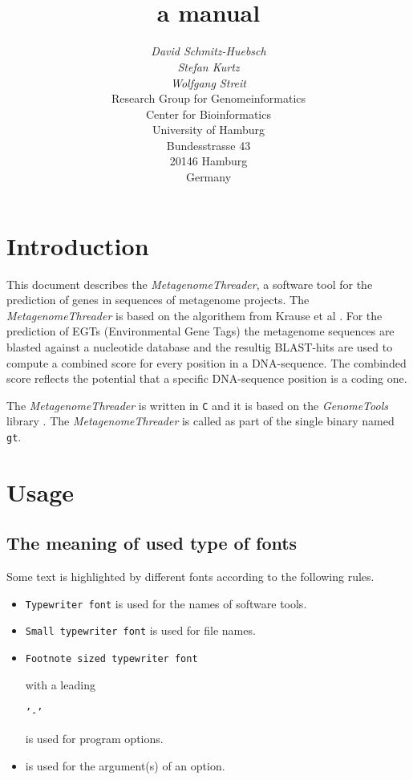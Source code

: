 \documentclass[12pt,titlepage]{article}
\title{\MetagenomeThreader\\
a manual}
\author{\begin{tabular}{c}
         \textit{David Schmitz-Huebsch}\\
         \textit{Stefan Kurtz}\\
         \textit{Wolfgang Streit}\\[1cm]
         Research Group for Genomeinformatics\\
         Center for Bioinformatics\\
         University of Hamburg\\
         Bundesstrasse 43\\
         20146 Hamburg\\
         Germany\\[1cm]
        \end{tabular}}
\newcommand{\MetagenomeThreader}{\textit{MetagenomeThreader}\xspace}
\newcommand{\GenomeTools}{\textit{GenomeTools}\xspace}
\newcommand{\Gt}{\texttt{gt}\xspace}
\begin{document}
\maketitle

\section{Introduction} \label{Introduction}

This document describes the \MetagenomeThreader, a software tool
for the prediction of genes in sequences of metagenome projects.
The \MetagenomeThreader is based on the algorithem from Krause et al \cite{krause}.
For the prediction of EGTs (Environmental Gene Tags) the metagenome sequences are
blasted against a nucleotide database and the resultig BLAST-hits are used to
compute a combined score for every position in a DNA-sequence. The combinded score
reflects the potential that a specific DNA-sequence position is a coding one.

The \MetagenomeThreader is written in \texttt{C} and it is based 
on the \GenomeTools library \cite{genometools}. The \MetagenomeThreader is called
as part of the single binary named \Gt.

\section{Usage} \label{Usage}

\subsection{The meaning of used type of fonts} \label{Fonts}
Some text is highlighted by different fonts according to the following rules.

\begin{itemize}
\item \texttt{Typewriter font} is used for the names of software tools.
\item \texttt{\small{Small typewriter font}} is used for file names.
\item \begin{footnotesize}\texttt{Footnote sized typewriter font}
      \end{footnotesize} with a leading 
      \begin{footnotesize}\texttt{'-'}\end{footnotesize} 
      is used for program options.
\item {} is used for the argument(s) of an
      option.
\end{itemize}
\end{document}
